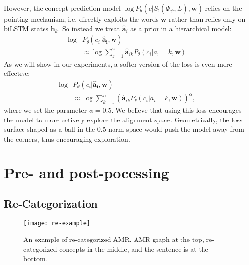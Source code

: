 \documentclass[11pt,a4paper]{article}
\begin{document}
However, the concept prediction model $\log P_\theta(c | S_t(\Phi_\psi, \Sigma), \mathbf{w})$ relies on the pointing mechanism, i.e. directly exploits the words $\mathbf{w}$ rather than relies only on biLSTM states $\mathbf{h}_k$. So instead we treat $\hat{\mathbf{a}}_i$ as a prior in a hierarchical model:
\begin{align}
 \log & P_\theta(c_i | \mathbf{\hat{a}_i}, \mathbf{w}) \nonumber \\ 
 \label{eq:h-model}
& \approx 
 \log \sum_{k=1}^{n}{\hat{\mathbf{a}}_{ik}  P_\theta(c_i | a_i = k, \mathbf{w})  }
\end{align}
As we will show in our experiments, a softer version of the loss 
is even more effective:
\begin{align}
\nonumber
 \log & P_\theta(c_i | \mathbf{\hat{a}_i}, \mathbf{w}) \\
 \label{eq:soft-model}
 &
 \approx 
 {
\log \sum_{k=1}^{n}{  ( \hat{\mathbf{a}}_{ik} P_\theta(c_i | a_i = k, \mathbf{w}) )^{\alpha}  }},
\end{align}
where we set the parameter $\alpha = 0.5$. We believe that using this loss encourages the model to more actively explore the alignment space. Geometrically, the loss surface shaped as a ball in the 0.5-norm space would push the model away from the corners, thus encouraging exploration.

\section{Pre- and post-pocessing}
\label{sect:prepost}

\subsection{Re-Categorization}\label{sec:re-cat}

\begin{figure}[t!]
\centering
\texttt{[image: re-example]}
\vspace{-2ex}
\caption{An example of re-categorized AMR. AMR graph at the top, re-categorized concepts in the middle, and the sentence is at the bottom.}
\label{fig:re-example}
\end{figure}
\end{document}
